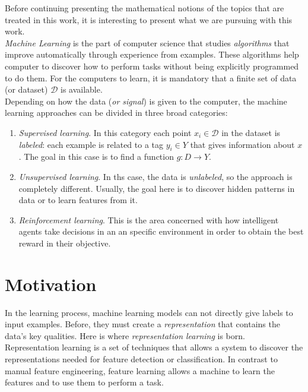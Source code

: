 


Before continuing presenting the mathematical notions of the topics that are treated in this work, it is interesting to present what we are pursuing with this work.\\

\emph{Machine Learning} is the part of computer science that studies \emph{algorithms} that improve automatically through experience from examples. These algorithms help computer to discover how to
perform tasks without being explicitly programmed to do them. For the computers to learn, it is mandatory that a finite set of data (or dataset) $\mathcal D$ is available. \\

Depending on how the data (\emph{or signal}) is given to the computer, the machine learning approaches can be divided in three broad categories:
\begin{enumerate}
    \item \emph{Supervised learning}. In this category each point $x_i \in \mathcal D$ in the dataset is \emph{labeled}: each example is related to a tag $y_i \in Y$ that gives information about $x$. The goal in this case is to find 
    a function $g:D \to Y$.
    \item \emph{Unsupervised learning}. In ths case, the data is \emph{unlabeled}, so the approach is completely different. Usually, the goal here is to discover hidden patterns in data or to learn features from it.
    \item \emph{Reinforcement learning}. This is the area concerned with how intelligent agents take decisions in an an specific environment in order to obtain the best reward in their objective.
\end{enumerate}





\section*{Motivation}
In the learning process, machine learning models can not directly give labels to input examples. Before, they must create a \emph{representation} that 
contains the data's key qualities.  Here is where \emph{representation learning} is born. \\

Representation learning is a set of techniques that allows a system to discover the representations needed for feature detection or classification. 
In contrast to manual feature engineering, feature learning allows a machine to learn the features and to use them to perform a task.\\

